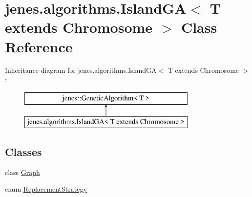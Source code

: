 \hypertarget{classjenes_1_1algorithms_1_1_island_g_a_3_01_t_01extends_01_chromosome_01_4}{\section{jenes.\-algorithms.\-Island\-G\-A$<$ T extends Chromosome $>$ Class Reference}
\label{classjenes_1_1algorithms_1_1_island_g_a_3_01_t_01extends_01_chromosome_01_4}
}
Inheritance diagram for jenes.\-algorithms.\-Island\-G\-A$<$ T extends Chromosome $>$\-:\begin{figure}[H]
\begin{center}
\leavevmode
\includegraphics[height=2.000000cm]{classjenes_1_1algorithms_1_1_island_g_a_3_01_t_01extends_01_chromosome_01_4}
\end{center}
\end{figure}
\subsection*{Classes}
\begin{DoxyCompactItemize}
\item 
class \hyperlink{classjenes_1_1algorithms_1_1_island_g_a_3_01_t_01extends_01_chromosome_01_4_1_1_graph}{Graph}
\item 
enum \hyperlink{enumjenes_1_1algorithms_1_1_island_g_a_3_01_t_01extends_01_chromosome_01_4_1_1_replacement_strategy}{Replacement\-Strategy}
\end{DoxyCompactItemize}
